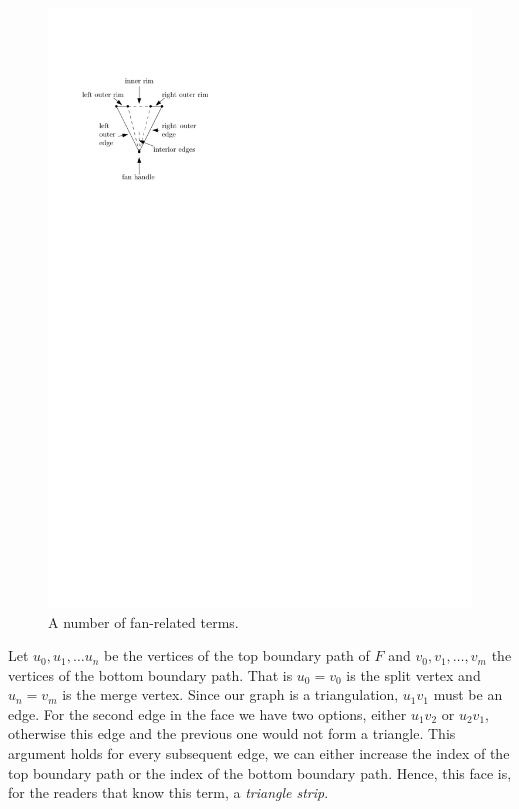     \begin{figure}[b]
      \centering
      \includegraphics[scale=1]{rectangularDuals/img/fanterms}
      \caption{A number of fan-related terms.}
      \label{fig:rect:fanTerms}
    \end{figure}

    Let $u_0 , u_1, \ldots u_n$ be the vertices of the top boundary path of $F$ and $v_0, v_1, \ldots, v_m$ the vertices of the bottom boundary path.
    That is $u_0=v_0$ is the split vertex and $u_n = v_m$ is the merge vertex.
    Since our graph is a triangulation, $u_1v_1$ must be an edge.
    For the second edge in the face we have two options, either $u_1v_2$ or $u_2v_1$, otherwise this edge and the previous one would not form a triangle.
    This argument holds for every subsequent edge, we can either increase the index of the top boundary path or the index of the bottom boundary path.
    Hence, this face is, for the readers that know this term, a \emph{triangle strip}.

